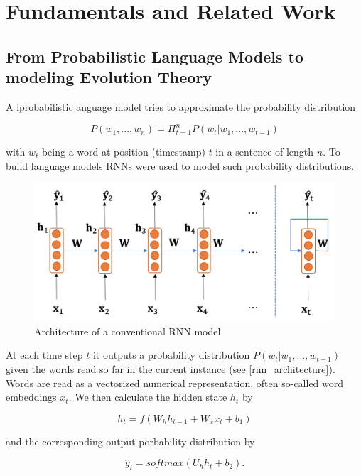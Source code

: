 \section{Fundamentals and Related Work} \label{fundamentals}

\subsection{From Probabilistic Language Models to modeling Evolution Theory} \label{fundamentalsA}

A lprobabilistic anguage model tries to approximate the probability distribution 

\begin{equation}
	P(w_1, ..., w_n) = \Pi_{t=1}^{n} P(w_t | w_1, ..., w_{t-1})
\end{equation}

with $w_t$ being a word at position (timestamp) $t$ in a sentence of length $n$. To build language models \acp{RNN} were used to model such probability distributions.

\begin{figure}[ht]
	\centering
	\includegraphics[width=0.8\linewidth]{figures/rnn_architecture.png}
	\caption{Architecture of a conventional \ac{RNN} model \cite{Gertz2020}}
	\label{rnn_architecture}
\end{figure}

At each time step $t$ it outputs a probability distribution $P(w_t | w_1, ..., w_{t-1})$ given the words read so far in the current instance (see \autoref{rnn_architecture}). Words are read as a vectorized numerical representation, often so-called word embeddings $x_t$. We then calculate the hidden state $h_t$ by

\begin{equation}
	h_t = f(W_h h_{t-1} + W_x x_t + b_1)
\end{equation}

and the corresponding output porbability distribution by 

\begin{equation}
	\hat{y}_t = softmax(U_h h_t + b_2).
\end{equation}


